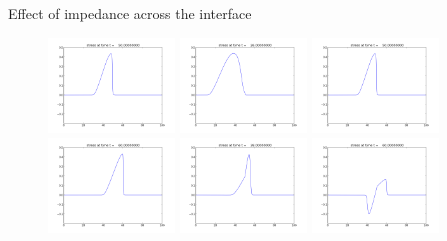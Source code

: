 \documentclass{beamer}
\begin{document}
\begin{frame}{Effect of impedance across the interface}
\begin{figure}
  \includegraphics[width=0.3\textwidth]{homo1.png}
  \includegraphics[width=0.3\textwidth]{sound1.png}
  \includegraphics[width=0.3\textwidth]{reflect1.png}\\
  \includegraphics[width=0.3\textwidth]{homo3.png}
  \includegraphics[width=0.3\textwidth]{sound3.png}
  \includegraphics[width=0.3\textwidth]{reflect3.png}\\

\end{figure}
\end{frame}
\end{document}
